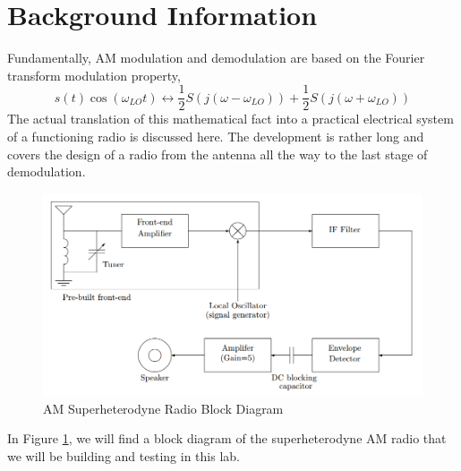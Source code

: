 \documentclass{article}
\begin{document}
\section{Background Information}
Fundamentally, AM modulation and demodulation are based on the Fourier transform modulation property, $$ s(t)\cos(\omega_{LO}t)\leftrightarrow \frac{1}{2}S(j(\omega-\omega_{LO}))+\frac{1}{2}S(j(\omega+\omega_{LO})) $$
The actual translation of this mathematical fact into a practical electrical system of a functioning radio is discussed here. The development is rather long and covers the design of a radio from the antenna all the way to the last stage of demodulation.\\
\begin{figure}[htbp]
	\centering
	\includegraphics[width=0.7\linewidth]{fig1.png}
	\caption{AM Superheterodyne Radio Block Diagram}
	\label{bcg}
\end{figure}
In Figure \ref{bcg}, we will find a block diagram of the superheterodyne AM radio that we will be building and testing in this lab.
\end{document}
